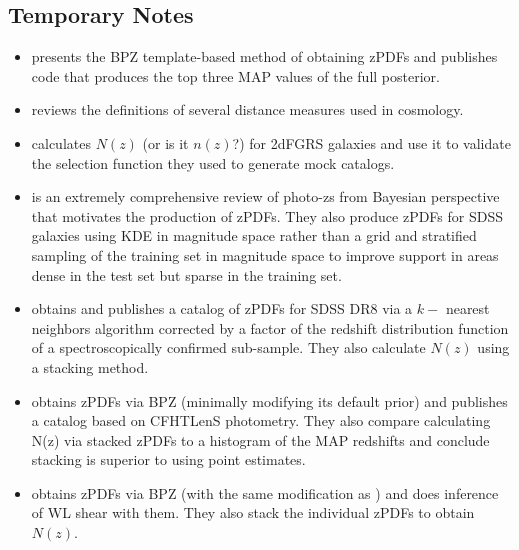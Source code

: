 \documentclass[preprint]{aastex}
\begin{document}
\clearpage
\subsection*{Temporary Notes}

\begin{itemize}
\item \citet{ben98} presents the BPZ template-based method of obtaining zPDFs and publishes code that produces the top three MAP values of the full posterior.  
\item \citet{hog99} reviews the definitions of several distance measures used in cosmology.
\item \citet{nor01} calculates $N(z)$ (or is it $n(z)$?) for 2dFGRS galaxies and use it to validate the selection function they used to generate mock catalogs.
\item \citet{bud08} is an extremely comprehensive review of photo-zs from Bayesian perspective that motivates the production of zPDFs. They also produce zPDFs for SDSS galaxies using KDE in magnitude space rather than a grid and stratified sampling of the training set in magnitude space to improve support in areas dense in the test set but sparse in the training set.
\item \citet{she11} obtains and publishes a catalog of zPDFs for SDSS DR8 via a $k-$ nearest neighbors algorithm corrected by a factor of the redshift distribution function of a spectroscopically confirmed sub-sample.  They also calculate $N(z)$ using a stacking method.
\item \citet{hil11} obtains zPDFs via BPZ (minimally modifying its default prior) and publishes a catalog based on CFHTLenS photometry.  They also compare calculating N(z) via stacked zPDFs to a histogram of the MAP redshifts and conclude stacking is superior to using point estimates.
\item \citet{kel12} obtains zPDFs via BPZ (with the same modification as \citet{hil11}) and does inference of WL shear with them.  They also stack the individual zPDFs to obtain $N(z)$.

\end{itemize}
\end{document}
